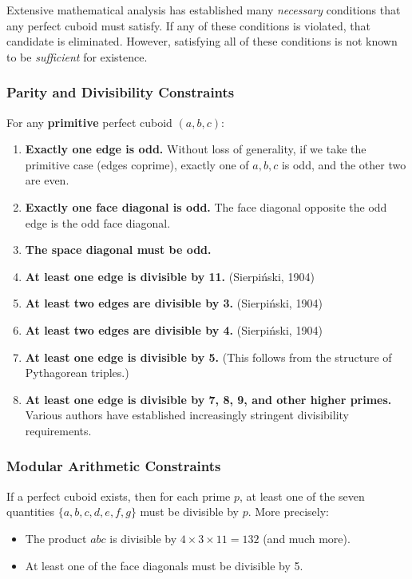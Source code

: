 \documentclass[10pt,a4paper]{article}
\begin{document}
Extensive mathematical analysis has established many \emph{necessary} conditions that any perfect cuboid must satisfy. If any of these conditions is violated, that candidate is eliminated. However, satisfying all of these conditions is not known to be \emph{sufficient} for existence.

\subsubsection{Parity and Divisibility Constraints}

For any \textbf{primitive} perfect cuboid $(a, b, c)$:

\begin{enumerate}
    \item \textbf{Exactly one edge is odd.} Without loss of generality, if we take the primitive case (edges coprime), exactly one of $a, b, c$ is odd, and the other two are even.
    \item \textbf{Exactly one face diagonal is odd.} The face diagonal opposite the odd edge is the odd face diagonal.
    \item \textbf{The space diagonal must be odd.}
    \item \textbf{At least one edge is divisible by 11.} (Sierpiński, 1904)
    \item \textbf{At least two edges are divisible by 3.} (Sierpiński, 1904)
    \item \textbf{At least two edges are divisible by 4.} (Sierpiński, 1904)
    \item \textbf{At least one edge is divisible by 5.} (This follows from the structure of Pythagorean triples.)
    \item \textbf{At least one edge is divisible by 7, 8, 9, and other higher primes.} Various authors have established increasingly stringent divisibility requirements.
\end{enumerate}

\subsubsection{Modular Arithmetic Constraints}

If a perfect cuboid exists, then for each prime $p$, at least one of the seven quantities $\{a, b, c, d, e, f, g\}$ must be divisible by $p$. More precisely:

\begin{itemize}
    \item The product $abc$ is divisible by $4 \times 3 \times 11 = 132$ (and much more).
    \item At least one of the face diagonals must be divisible by 5.
\end{itemize}
\end{document}
